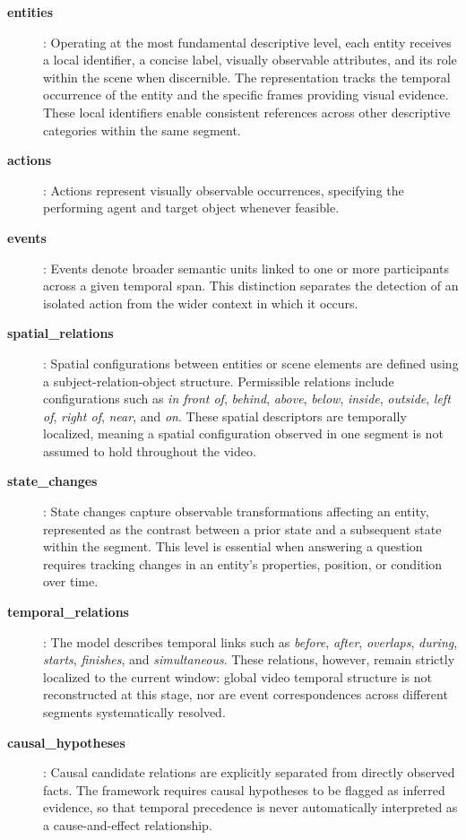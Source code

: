 \begin{description}
\item[\textbf{entities}]: Operating at the most fundamental descriptive level, each entity receives a local identifier, a concise label, visually observable attributes, and its role within the scene when discernible. The representation tracks the temporal occurrence of the entity and the specific frames providing visual evidence. These local identifiers enable consistent references across other descriptive categories within the same segment.
\item[\textbf{actions}]: Actions represent visually observable occurrences, specifying the performing agent and target object whenever feasible.
\item[\textbf{events}]: Events denote broader semantic units linked to one or more participants across a given temporal span. This distinction separates the detection of an isolated action from the wider context in which it occurs.
\item[\textbf{spatial\_relations}]: Spatial configurations between entities or scene elements are defined using a subject-relation-object structure. Permissible relations include configurations such as \textit{in front of}, \textit{behind}, \textit{above}, \textit{below}, \textit{inside}, \textit{outside}, \textit{left of}, \textit{right of}, \textit{near}, and \textit{on}. These spatial descriptors are temporally localized, meaning a spatial configuration observed in one segment is not assumed to hold throughout the video.
\item[\textbf{state\_changes}]: State changes capture observable transformations affecting an entity, represented as the contrast between a prior state and a subsequent state within the segment. This level is essential when answering a question requires tracking changes in an entity's properties, position, or condition over time.
\item[\textbf{temporal\_relations}]: The model describes temporal links such as \textit{before}, \textit{after}, \textit{overlaps}, \textit{during}, \textit{starts}, \textit{finishes}, and \textit{simultaneous}. These relations, however, remain strictly localized to the current window: global video temporal structure is not reconstructed at this stage, nor are event correspondences across different segments systematically resolved.
\item[\textbf{causal\_hypotheses}]: Causal candidate relations are explicitly separated from directly observed facts. The framework requires causal hypotheses to be flagged as inferred evidence, so that temporal precedence is never automatically interpreted as a cause-and-effect relationship.
\end{description}
